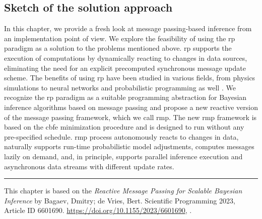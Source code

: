 \subsection*{Sketch of the solution approach}

In this chapter, we provide a fresh look at message passing-based inference from an
implementation point of view.
We explore the feasibility of using the \acf{rp} paradigm
\citep{bainomugisha_reactive_survey_2013} as a solution to the problems mentioned above.
\ac{rp} supports the execution of computations by dynamically reacting to changes in data sources,
eliminating the need for an explicit precomputed synchronous message update scheme.
The benefits of using \ac{rp} have been studied in various fields, from physics simulations
\citep{boussinot_reactive_2015} to neural networks \citep{busch_pushnet_2020} and
probabilistic programming as well \citep{baudart_reactive_2019}.
We recognize the \ac{rp} paradigm as a suitable programming abstraction for Bayesian inference
algorithms based on message passing and propose a new reactive version of the message passing
framework, which we call \acf{rmp}.
The new \ac{rmp} framework is based on the \ac{cbfe} minimization procedure and is designed to run
without any pre-specified schedule.
\Ac{rmp} process autonomously reacts to changes in data, naturally supports run-time probabilistic model
adjustments, computes messages lazily on demand, and, in principle, supports parallel
inference execution and asynchronous data streams with different update rates.

\par\noindent\rule{\textwidth}{0.5pt}

This chapter is based on the \textit{Reactive Message Passing for Scalable Bayesian Inference} by Bagaev, Dmitry; de Vries, Bert. Scientific Programming 2023, Article ID 6601690. \url{https://doi.org/10.1155/2023/6601690}, \citep{bagaev_reactive_2023}.

